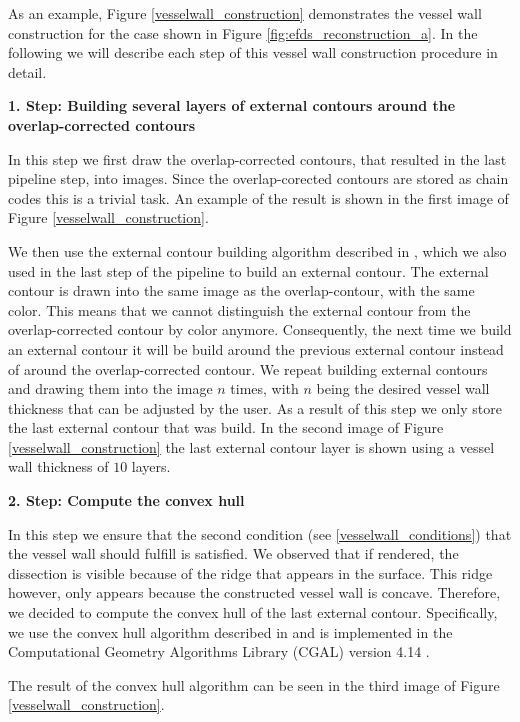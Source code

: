 \documentclass[thesis.tex]{subfiles}
\begin{document}
As an example, Figure \ref{vesselwall_construction} demonstrates the vessel wall construction for the case shown in Figure \ref{fig:efds_reconstruction_a}. In the following we will describe each step of this vessel wall construction procedure in detail.

\textbf{1. Step:  Building several layers of external contours around the overlap-corrected contours}

In this step we first draw the overlap-corrected contours, that resulted in the last pipeline step, into images. Since the overlap-corected contours are stored as chain codes this is a trivial task. An example of the result is shown in the first image of Figure \ref{vesselwall_construction}. 

We then use the  external contour building algorithm described in \cite{inside_contour}, which we also used in the last step of the pipeline to build an external contour. The external contour is drawn into the same image as the overlap-contour, with the same color. This means that we cannot distinguish the external contour from the overlap-corrected contour by color anymore. Consequently, the next time we build an external contour it will be build around the previous external contour instead of around the overlap-corrected contour. We repeat building external contours and drawing them into the image $n$ times, with $n$ being the desired vessel wall thickness that can be adjusted by the user. As a result of this step we only store the last external contour that was build. In the second image of Figure \ref{vesselwall_construction} the last external contour layer is shown using a vessel wall thickness of $10$ layers.

\textbf{2. Step: Compute the convex hull}

In this step we ensure that the second condition (see \ref{vesselwall_conditions}) that the vessel wall should fulfill is satisfied. We observed that if rendered, the dissection is visible because of the ridge that appears in the surface. This ridge however, only appears because the constructed vessel wall is concave. Therefore, we decided to compute the convex hull of the last external contour. Specifically, we use the convex hull algorithm described in \cite{andrew1979another} and is implemented in the Computational Geometry Algorithms Library (CGAL) version 4.14 \cite{cgal}. 

The result of the convex hull algorithm can be seen in the third image of Figure \ref{vesselwall_construction}.
\end{document}
